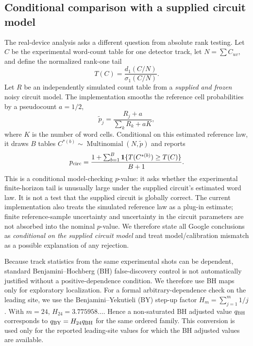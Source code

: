 \documentclass[11pt]{article}
\begin{document}
\subsection{Conditional comparison with a supplied circuit model}
\label{sec:modelcheck}
The real-device analysis asks a different question from absolute rank testing. Let $C$ be the experimental word-count table for one detector track, let $N=\sum C_{uv}$, and define the normalized rank-one tail
\begin{equation}
    T(C)=\frac{d_1(C/N)}{\sigma_1(C/N)}.
    \label{eq:normalizedtail}
\end{equation}
Let $R$ be an independently simulated count table from a \emph{supplied and frozen} noisy circuit model. The implementation smooths the reference cell probabilities by a pseudocount $a=1/2$,
\begin{equation}
    \widetilde p_j=\frac{R_j+a}{\sum_k R_k+aK},
    \label{eq:refprob}
\end{equation}
where $K$ is the number of word cells. Conditional on this estimated reference law, it draws $B$ tables
$C^{*(b)}\sim\operatorname{Multinomial}(N,\widetilde p)$ and reports
\begin{equation}
    p_{\rm circ}=\frac{1+\sum_{b=1}^{B}
        \mathbf 1\{T(C^{*(b)})\ge T(C)\}}{B+1}.
    \label{eq:circuitp}
\end{equation}
This is a conditional model-checking $p$-value: it asks whether the experimental finite-horizon tail is unusually large under the supplied circuit's estimated word law. It is not a test that the supplied circuit is globally correct. The current implementation also treats the simulated reference law as a plug-in estimate; finite reference-sample uncertainty and uncertainty in the circuit parameters are not absorbed into the nominal $p$-value. We therefore state all Google conclusions as \emph{conditional on the supplied circuit model} and treat model/calibration mismatch as a possible explanation of any rejection.

Because track statistics from the same experimental shots can be dependent, standard Benjamini--Hochberg (BH) false-discovery control is not automatically justified without a positive-dependence condition. We therefore use BH maps only for exploratory localization. For a formal arbitrary-dependence check on the leading site, we use the Benjamini--Yekutieli (BY) step-up factor $H_m=\sum_{j=1}^m1/j$ \cite{benjamini2001dependency}. With $m=24$, $H_{24}=3.775958\ldots$. Hence a non-saturated BH adjusted value $q_{\rm BH}$ corresponds to $q_{\rm BY}=H_{24}q_{\rm BH}$ for the same ordered family. This conversion is used only for the reported leading-site values for which the BH adjusted values are available.
\end{document}
